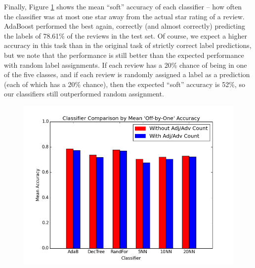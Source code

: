 Finally, Figure \ref{offbyone} shows the mean ``soft'' accuracy of each classifier -- how often the classifier was at most one star away from the actual star rating of a review. AdaBoost performed the best again, correctly (and almost correctly) predicting the labels of 78.61\% of the reviews in the test set. Of course, we expect a higher accuracy in this task than in the original task of strictly correct label predictions, but we note that the performance is still better than the expected performance with random label assignments. If each review has a 20\% chance of being in one of the five classes, and if each review is randomly assigned a label as a prediction (each of which has a 20\% chance), then the expected ``soft'' accuracy is 52\%, so our classifiers still outperformed random assignment.

\begin{figure}[!h]
\centering
\includegraphics[scale=0.5]{compoffbyone}
\caption{}
\label{offbyone}
\end{figure}

